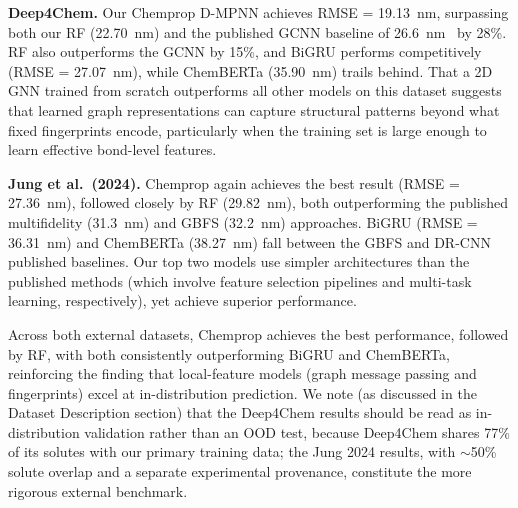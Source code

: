 \documentclass[journal=jcisd8,manuscript=article]{achemso}
\newcommand{\added}[1]{{\color{addedblue}#1}}
\begin{document}
\textbf{Deep4Chem.}
Our Chemprop D-MPNN achieves RMSE = 19.13~nm, surpassing both our RF (22.70~nm) and the published GCNN baseline of 26.6~nm~\cite{joung2021deep} by 28\%.
RF also outperforms the GCNN by 15\%, and BiGRU performs competitively (RMSE = 27.07~nm), while ChemBERTa (35.90~nm) trails behind.
That a 2D GNN trained from scratch outperforms all other models on this dataset suggests that learned graph representations can capture structural patterns beyond what fixed fingerprints encode, particularly when the training set is large enough to learn effective bond-level features.

\textbf{Jung et al.\ (2024).}
Chemprop again achieves the best result (RMSE = 27.36~nm), followed closely by RF (29.82~nm), both outperforming the published multifidelity (31.3~nm) and GBFS (32.2~nm) approaches.
BiGRU (RMSE = 36.31~nm) and ChemBERTa (38.27~nm) fall between the GBFS and DR-CNN published baselines.
Our top two models use simpler architectures than the published methods (which involve feature selection pipelines and multi-task learning, respectively), yet achieve superior performance.

Across both external datasets, Chemprop achieves the best performance, followed by RF, with both consistently outperforming BiGRU and ChemBERTa, reinforcing the finding that local-feature models (graph message passing and fingerprints) excel at in-distribution prediction. \added{We note (as discussed in the Dataset Description section) that the Deep4Chem results should be read as in-distribution validation rather than an OOD test, because Deep4Chem shares 77\% of its solutes with our primary training data; the Jung 2024 results, with $\sim$50\% solute overlap and a separate experimental provenance, constitute the more rigorous external benchmark.}
\end{document}
